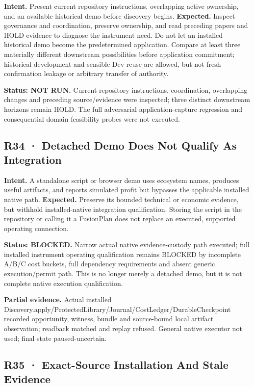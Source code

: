 \documentclass[10pt,letterpaper]{article}
\begin{document}
\textbf{Intent.} Present current repository instructions, overlapping
active ownership, and an available historical demo before discovery
begins. \textbf{Expected.} Inspect governance and coordination, preserve
ownership, and read preceding papers and HOLD evidence to diagnose the
instrument need. Do not let an installed historical demo become the
predetermined application. Compare at least three materially different
downstream possibilities before application commitment; historical
development and sensible Dev reuse are allowed, but not
fresh-confirmation leakage or arbitrary transfer of authority.

\textbf{Status: NOT RUN.} Current repository instructions, coordination,
overlapping changes and preceding source/evidence were inspected; three
distinct downstream horizons remain HOLD. The full adversarial
application-capture regression and consequential domain feasibility
probes were not executed.

\hypertarget{r34-detached-demo-does-not-qualify-as-integration}{%
\subsection{R34 · Detached Demo Does Not Qualify As
Integration}\label{r34-detached-demo-does-not-qualify-as-integration}}

\textbf{Intent.} A standalone script or browser demo uses ecosystem
names, produces useful artifacts, and reports simulated profit but
bypasses the applicable installed native path. \textbf{Expected.}
Preserve its bounded technical or economic evidence, but withhold
installed-native integration qualification. Storing the script in the
repository or calling it a FusionPlan does not replace an executed,
supported operating connection.

\textbf{Status: BLOCKED.} Narrow actual native evidence-custody path
executed; full installed instrument operating qualification remains
BLOCKED by incomplete A/B/C cost buckets, full dependency requirements
and absent generic execution/permit path. This is no longer merely a
detached demo, but it is not complete native execution qualification.

\textbf{Partial evidence.} Actual installed
Discovery.apply/ProtectedLibrary/Journal/CostLedger/DurableCheckpoint
recorded opportunity, witness, bundle and source-bound local artifact
observation; readback matched and replay refused. General native
executor not used; final state paused-uncertain.

\hypertarget{r35-exact-source-installation-and-stale-evidence}{%
\subsection{R35 · Exact-Source Installation And Stale
Evidence}\label{r35-exact-source-installation-and-stale-evidence}}
\end{document}
